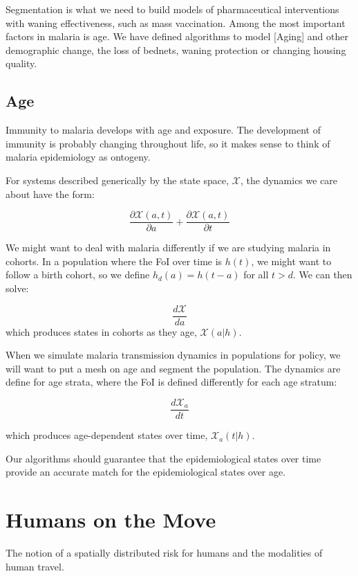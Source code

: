\documentclass[
]{book}
\begin{document}
Segmentation is what we need to build models of pharmaceutical interventions with waning effectiveness, such as mass vaccination. Among the most important factors in malaria is age. We have defined algorithms to model {[}Aging{]} and other demographic change, the loss of bednets, waning protection or changing housing quality.

\hypertarget{age}{%
\subsection{Age}\label{age}}

Immunity to malaria develops with age and exposure. The development of immunity is probably changing throughout life, so it makes sense to think of malaria epidemiology as ontogeny.

For systems described generically by the state space, \(\mathscr X\), the dynamics we care about have the form:

\[\frac{\partial {\mathscr X}(a,t)}{\partial a} + \frac{\partial {\mathscr X}(a,t)}{\partial t}\]

We might want to deal with malaria differently if we are studying malaria in cohorts. In a population where the FoI over time is \(h(t)\), we might want to follow a birth cohort, so we define \(h_d(a) = h(t-a)\) for all \(t>d\). We can then solve:

\[\frac{d{\mathscr X}}{d a} \]
which produces states in cohorts as they age, \({\mathscr X}(a|h).\)

When we simulate malaria transmission dynamics in populations for policy, we will want to put a mesh on age and segment the population. The dynamics are define for age strata, where the FoI is defined differently for each age stratum:

\[\frac{d{\mathscr X}_a}{d t}\]

which produces age-dependent states over time, \({\mathscr X}_a(t|h).\)

Our algorithms should guarantee that the epidemiological states over time provide an accurate match for the epidemiological states over age.

\hypertarget{humans-on-the-move}{%
\section{Humans on the Move}\label{humans-on-the-move}}

The notion of a spatially distributed risk for humans and the modalities of human travel.
\end{document}
